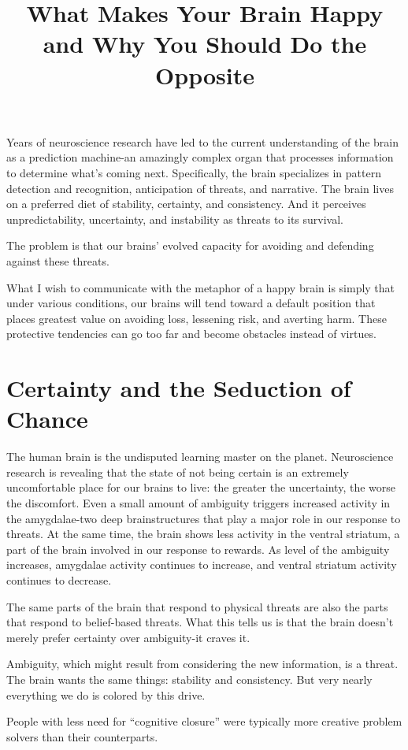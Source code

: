 \documentclass[ebook,12pt,oneside,openany]{memoir}
\begin{document}
\title{What Makes Your Brain Happy and Why You Should Do the Opposite}
\maketitle

Years of neuroscience research have led to the current understanding of the brain as a prediction machine-an amazingly complex organ that processes information to determine what's coming next.
Specifically, the brain specializes in pattern detection and recognition, anticipation of threats, and narrative.
The brain lives on a preferred diet of stability, certainty, and consistency.
And it perceives unpredictability, uncertainty, and instability as threats to its survival.

The problem is that our brains' evolved capacity for avoiding and defending against these threats.

What I wish to communicate with the metaphor of a happy brain is simply that under various conditions, our brains will tend toward a default position that places greatest value on avoiding loss, lessening risk, and averting harm.
These protective tendencies can go too far and become obstacles instead of virtues.

\section{Certainty and the Seduction of Chance}
The human brain is the undisputed learning master on the planet. 
Neuroscience research is revealing that the state of not being certain is an extremely uncomfortable place for our brains to live:
the greater the uncertainty, the worse the discomfort. Even a small amount of ambiguity triggers increased activity in the amygdalae-two deep brainstructures that play a major role in our response to threats.
At the same time, the brain shows less activity in the ventral striatum, a part of the brain involved in our response to rewards.
As level of the ambiguity increases, amygdalae activity continues to increase, and ventral striatum activity continues to decrease.

The same parts of the brain that respond to physical threats are also the parts that respond to belief-based threats.
What this tells us is that the brain doesn't merely prefer certainty over ambiguity-it craves it.

Ambiguity, which might result from considering the new information, is a threat.
The brain wants the same things: stability and consistency. But very nearly everything we do is colored by this drive.

People with less need for ``cognitive closure'' were typically more creative problem solvers than their counterparts.
\end{document}
